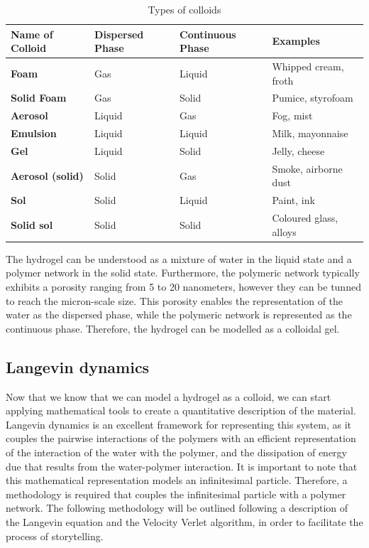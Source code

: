 \begin{table}[ht!]
\centering
\begin{tabularx}{12cm}{|>{\centering\arraybackslash\bfseries}p{2cm}|>{\centering\arraybackslash}X|>{\centering\arraybackslash}X|>{\centering\arraybackslash}X|}
\toprule
\textbf{Name of Colloid} & \textbf{Dispersed Phase} & \textbf{Continuous Phase} & \textbf{Examples} \\
\midrule
Foam            & Gas  & Liquid & Whipped cream, froth \\
\midrule
Solid Foam      & Gas  & Solid  & Pumice, styrofoam \\
\midrule
Aerosol         & Liquid & Gas   & Fog, mist \\
\midrule
Emulsion        & Liquid & Liquid & Milk, mayonnaise \\
\midrule
Gel             & Liquid & Solid  & Jelly, cheese \\
\midrule
Aerosol (solid) & Solid  & Gas    & Smoke, airborne dust \\
\midrule
Sol             & Solid  & Liquid & Paint, ink \\
\midrule
Solid sol       & Solid  & Solid  & Coloured glass, alloys \\
\bottomrule
\end{tabularx}
\caption{Types of colloids}\label{tab:colloids}
\end{table}

The hydrogel can be understood as a mixture of water in the liquid state and a polymer network in the solid state.
Furthermore, the polymeric network typically exhibits a porosity ranging from 5 to 20 nanometers, however they can be tunned to reach the micron-scale size.
This porosity enables the representation of the water as the dispersed phase, while the polymeric network is represented as the continuous phase.
Therefore, the hydrogel can be modelled as a colloidal gel.


\subsection{Langevin dynamics}

Now that we know that we can model a hydrogel as a colloid, we can start applying mathematical tools to create a quantitative description of the material.
Langevin dynamics is an excellent framework for representing this system, as it couples 
    the pairwise interactions of the polymers 
    with an efficient representation of the interaction of the water with the polymer, 
    and the dissipation of energy due that results from the water-polymer interaction.
It is important to note that this mathematical representation models an infinitesimal particle.
Therefore, a methodology is required that couples the infinitesimal particle with a polymer network.
The following methodology will be outlined following a description of the Langevin equation and the Velocity Verlet algorithm, in order to facilitate the process of storytelling.

